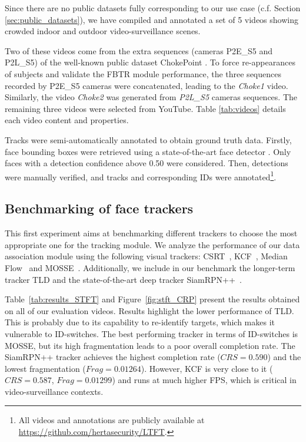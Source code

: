 Since there are no public datasets fully corresponding to our use case (c.f. Section \ref{sec:public_datasets}), we have compiled and annotated a set of 5 videos showing  crowded indoor and outdoor video-surveillance scenes. 

Two of these videos come from the extra sequences (cameras P2E\_S5 and P2L\_S5) of the well-known public dataset ChokePoint \cite{wong2011chokepoint}. To force re-appearances of subjects and validate the FBTR module performance, the three sequences recorded by P2E\_S5 cameras were concatenated, leading to the \textit{Choke1} video. Similarly, the video \textit{Choke2} was generated from \textit{P2L\_S5} cameras sequences. The remaining three videos were selected from YouTube. Table \ref{tab:videos} details each video content and properties.

Tracks were semi-automatically annotated to obtain ground truth data. Firstly, face bounding boxes were retrieved using a state-of-the-art face detector \cite{zhang2017faceboxes}. Only faces with a detection confidence above 0.50 were considered. Then, detections were manually verified, and tracks and corresponding IDs were annotated\footnote{All videos and annotations are publicly available at \url{https://github.com/hertasecurity/LTFT}.}.


\subsection{Benchmarking of face trackers} 
\label{sec:STFT_benchmark}

This first experiment aims at benchmarking different trackers to choose the most appropriate one for the tracking module. We analyze the performance of our data association module using the following visual trackers: CSRT~\cite{lukezic2017discriminative}, KCF~\cite{bochinski2018viou}, Median Flow~\cite{kalal2010forward} and MOSSE~\cite{bolme2010visual}. Additionally, we include in our benchmark the longer-term tracker TLD \cite{kalal2010face} and the state-of-the-art deep tracker SiamRPN++~\cite{li2019siamrpn++}. 

Table~\ref{tab:results_STFT} and Figure~\ref{fig:stft_CRP} present the results obtained on all of our evaluation videos. Results highlight the lower performance of TLD. This is probably due to its capability to re-identify targets, which makes it vulnerable to ID-switches. The best performing tracker in terms of ID-switches is MOSSE, but its high fragmentation leads to a poor overall completion rate. The SiamRPN++ tracker achieves the highest completion rate ($CRS=0.590$) and the lowest fragmentation ($Frag=0.01264$). However, KCF is very close to it ($CRS=0.587$, $Frag=0.01299$) and runs at much higher FPS, which is critical in video-surveillance contexts. 

